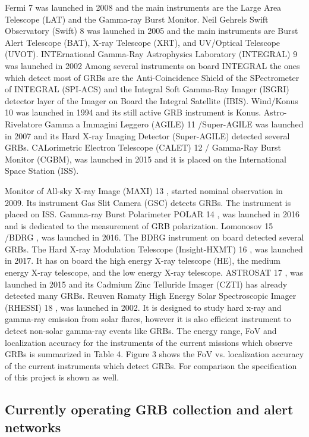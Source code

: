 \documentclass[12pt, a4paper,titlepage]{article}
\numberwithin{equation}{section}
\numberwithin{figure}{section}
\begin{document}
Fermi 7 \cite{grb28} was launched in 2008 and the main instruments are the Large Area Telescope (LAT) and the Gamma-ray Burst Monitor. 
Neil Gehrels Swift Observatory (Swift) 8 \cite{grb31} was launched in 2005 and the main instruments are
Burst Alert Telescope (BAT), X-ray Telescope (XRT), and UV/Optical Telescope (UVOT).
INTErnational Gamma-Ray Astrophysics Laboratory (INTEGRAL) 9 \cite{grb32} was launched in
2002 Among several instruments on board INTEGRAL the ones which detect most of GRBs are the Anti-Coincidence Shield of the SPectrometer of INTEGRAL (SPI-ACS) and the Integral Soft Gamma-Ray Imager (ISGRI) detector layer of the Imager on Board the Integral Satellite (IBIS).
Wind/Konus 10 \cite{grb33} was launched in 1994 and its still active GRB instrument is Konus.
Astro-Rivelatore Gamma a Immagini Leggero (AGILE) 11 /Super-AGILE \cite{grb34} was launched in
2007 and its Hard X-ray Imaging Detector (Super-AGILE) detected several GRBs.
CALorimetric Electron Telescope (CALET) 12 \cite{grb35} / Gamma-Ray Burst Monitor (CGBM), was launched in 2015 and it is placed on the International Space Station (ISS).

Monitor of All-sky X-ray Image (MAXI) 13 \cite{grb36}, started nominal observation in 2009. Its instrument Gas Slit Camera (GSC) detects GRBs. The instrument is placed on ISS.
Gamma-ray Burst Polarimeter POLAR 14 \cite{grb37}, was launched in 2016 and is dedicated to the measurement of GRB polarization.
Lomonosov 15 /BDRG \cite{grb38}, was launched in 2016. The BDRG instrument on board detected several GRBs.
The Hard X-ray Modulation Telescope (Insight-HXMT) 16 \cite{grb39}, was launched in 2017. It has on board the high energy X-ray telescope (HE), the medium energy X-ray telescope, and the low energy X-ray telescope.
ASTROSAT 17 \cite{grb40}, was launched in 2015 and its Cadmium Zinc Telluride Imager (CZTI) has already detected many GRBs.
Reuven Ramaty High Energy Solar Spectroscopic Imager (RHESSI) 18 \cite{grb41}, was launched in 2002. It is designed to study hard x-ray and gamma-ray emission from solar flares, however it is also efficient instrument to detect non-solar gamma-ray events like GRBs.
The energy range, FoV and localization accuracy for the instruments of the current missions which observe GRBs is summarized in Table 4. Figure 3 shows the FoV vs. localization accuracy of the current instruments which detect GRBs. For comparison the specification of this project is shown as
well.

\subsection{Currently operating GRB collection and alert networks}
\end{document}
